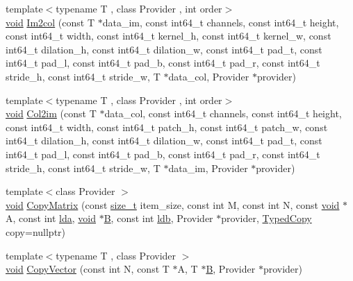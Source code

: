 \begin{DoxyCompactItemize}
\item 
{\footnotesize template$<$typename T , class Provider , int order$>$ }\\\mbox{\hyperlink{mlasi_8h_a88f941d423cb2a819b70a1358982b1a6}{void}} \mbox{\hyperlink{namespaceonnxruntime_1_1math_a5f4da90f31ab7005ff9eb336534d62e9}{Im2col}} (const T $\ast$data\+\_\+im, const int64\+\_\+t channels, const int64\+\_\+t height, const int64\+\_\+t width, const int64\+\_\+t kernel\+\_\+h, const int64\+\_\+t kernel\+\_\+w, const int64\+\_\+t dilation\+\_\+h, const int64\+\_\+t dilation\+\_\+w, const int64\+\_\+t pad\+\_\+t, const int64\+\_\+t pad\+\_\+l, const int64\+\_\+t pad\+\_\+b, const int64\+\_\+t pad\+\_\+r, const int64\+\_\+t stride\+\_\+h, const int64\+\_\+t stride\+\_\+w, T $\ast$data\+\_\+col, Provider $\ast$provider)
\item 
{\footnotesize template$<$typename T , class Provider , int order$>$ }\\\mbox{\hyperlink{mlasi_8h_a88f941d423cb2a819b70a1358982b1a6}{void}} \mbox{\hyperlink{namespaceonnxruntime_1_1math_a2146d8b8e4933d93cb0934db0ed984a1}{Col2im}} (const T $\ast$data\+\_\+col, const int64\+\_\+t channels, const int64\+\_\+t height, const int64\+\_\+t width, const int64\+\_\+t patch\+\_\+h, const int64\+\_\+t patch\+\_\+w, const int64\+\_\+t dilation\+\_\+h, const int64\+\_\+t dilation\+\_\+w, const int64\+\_\+t pad\+\_\+t, const int64\+\_\+t pad\+\_\+l, const int64\+\_\+t pad\+\_\+b, const int64\+\_\+t pad\+\_\+r, const int64\+\_\+t stride\+\_\+h, const int64\+\_\+t stride\+\_\+w, T $\ast$data\+\_\+im, Provider $\ast$provider)
\item 
{\footnotesize template$<$class Provider $>$ }\\\mbox{\hyperlink{mlasi_8h_a88f941d423cb2a819b70a1358982b1a6}{void}} \mbox{\hyperlink{namespaceonnxruntime_1_1math_aad70b3106415e3f15f8486445c356efc}{Copy\+Matrix}} (const \mbox{\hyperlink{mlasi_8h_a503efbc1c6e50825320ad909366b78ab}{size\+\_\+t}} item\+\_\+size, const int M, const int N, const \mbox{\hyperlink{mlasi_8h_a88f941d423cb2a819b70a1358982b1a6}{void}} $\ast$A, const int \mbox{\hyperlink{mlasi_8h_a38dd84f17dbd65aaf9f618e5c3ec496f}{lda}}, \mbox{\hyperlink{mlasi_8h_a88f941d423cb2a819b70a1358982b1a6}{void}} $\ast$\mbox{\hyperlink{mlasi_8h_a472f4360dfbf830e5135980ff43484b9}{B}}, const int \mbox{\hyperlink{mlasi_8h_a4431ce68ee01016a66896cedd34a57db}{ldb}}, Provider $\ast$provider, \mbox{\hyperlink{namespaceonnxruntime_1_1math_a4fd61c06d9e9e1bc3ceb526787eab4e7}{Typed\+Copy}} copy=nullptr)
\item 
{\footnotesize template$<$typename T , class Provider $>$ }\\\mbox{\hyperlink{mlasi_8h_a88f941d423cb2a819b70a1358982b1a6}{void}} \mbox{\hyperlink{namespaceonnxruntime_1_1math_aa29e2bcef4e925ce3578b22a4c848f56}{Copy\+Vector}} (const int N, const T $\ast$A, T $\ast$\mbox{\hyperlink{mlasi_8h_a472f4360dfbf830e5135980ff43484b9}{B}}, Provider $\ast$provider)

\end{DoxyCompactItemize}

